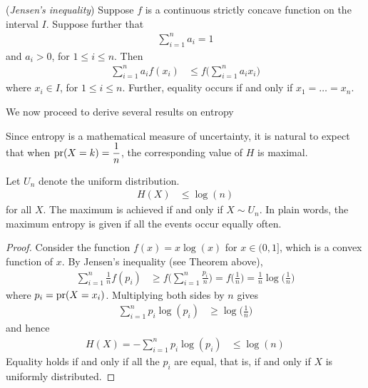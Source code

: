 \documentclass[a4paper, 12pt]{book} %
\begin{document}
\begin{theorem}
    (\emph{Jensen's inequality}) Suppose $f$ is a continuous strictly concave function on the interval $I$. Suppose further that
    \begin{align}
        \sum_{i=1}^n a_i = 1
    \end{align}
    and $a_i > 0$, for $1 \leq i \leq n$. Then 
    \begin{align}
        \sum_{i=1}^n a_i f(x_i) &\leq f\bigg( \sum_{i=1}^n a_i x_i\bigg)
    \end{align}
    where $x_i \in I$, for $1 \leq i \leq n$. Further, equality occurs if and only if $x_1 = \ldots = x_n$.
\end{theorem}
We now proceed to derive several results on entropy

Since entropy is a mathematical measure of uncertainty, it is natural to
expect that when $\operatorname{pr}(X =k) = \dfrac{1}{n}$, the corresponding value of $H$ is maximal.
\begin{proposition}
    Let $U_n$ denote the uniform distribution. 
    \begin{align}
        H(X) &\leq \log(n) 
    \end{align}
    for all $X$. The maximum is achieved if and only if $X \sim U_n$. In plain words, the maximum entropy is given if all the events occur equally often.
\end{proposition}
\begin{proof}
    Consider the function $f(x) = x\log(x)$ for $x \in (0, 1]$, which is a convex function of $x$. By Jensen's inequality (see Theorem above),
    \begin{align}
        \sum_{i=1}^{n} \frac{1}{n} f(p_i) &\geq f\bigg( \sum_{i=1}^{n} \frac{p_i}{n} \bigg) = f\bigg(\frac{1}{n}\bigg) = \frac{1}{n}\log\bigg(\frac{1}{n}\bigg)
    \end{align}
    where $p_i = \operatorname{pr}(X = x_i)$. Multiplying both sides by $n$ gives
    \begin{align}
        \sum_{i=1}^{n} p_i \log(p_i) &\geq \log\bigg(\frac{1}{n}\bigg)
    \end{align}
    and hence
    \begin{align}
        H(X) = -\sum_{i=1}^{n} p_i \log(p_i) &\leq \log(n)
    \end{align}
    Equality holds if and only if all the $p_i$ are equal, that is, if and only if $X$ is uniformly distributed.
\end{proof}
\end{document}
